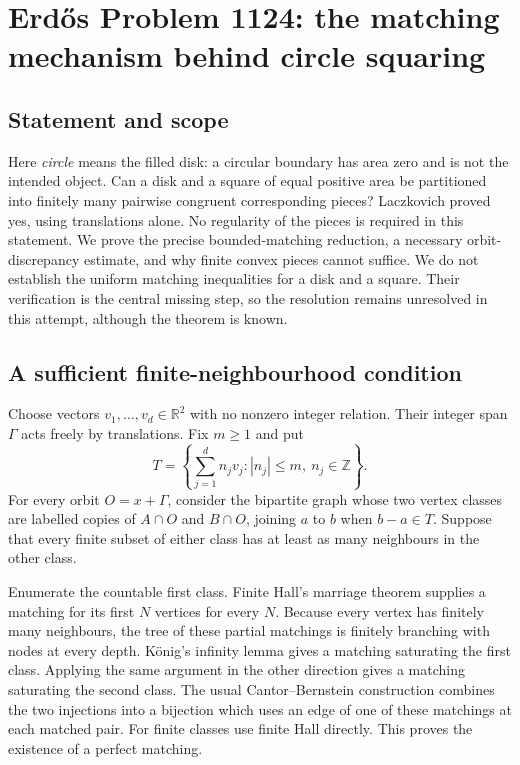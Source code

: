 \section*{Erd\H{o}s Problem 1124: the matching mechanism behind circle squaring}
\subsection*{Statement and scope}
Here \emph{circle} means the filled disk: a circular boundary has area zero and is not the intended object. Can a disk and a square of equal positive area be partitioned into finitely many pairwise congruent corresponding pieces? Laczkovich proved yes, using translations alone. No regularity of the pieces is required in this statement.
We prove the precise bounded-matching reduction, a necessary orbit-discrepancy estimate, and why finite convex pieces cannot suffice. We do not establish the uniform matching inequalities for a disk and a square. Their verification is the central missing step, so the resolution remains unresolved in this attempt, although the theorem is known.

\subsection*{A sufficient finite-neighbourhood condition}
Choose vectors $v_1,\ldots,v_d\in\mathbb R^2$ with no nonzero integer relation. Their integer span $\Gamma$ acts freely by translations. Fix $m\ge1$ and put
\[
 T=\left\{\sum_{j=1}^d n_jv_j:|n_j|\le m,\ n_j\in\mathbb Z\right\}.
\]
For every orbit $O=x+\Gamma$, consider the bipartite graph whose two vertex classes are labelled copies of $A\cap O$ and $B\cap O$, joining $a$ to $b$ when $b-a\in T$. Suppose that every finite subset of either class has at least as many neighbours in the other class.

Enumerate the countable first class. Finite Hall's marriage theorem supplies a matching for its first $N$ vertices for every $N$. Because every vertex has finitely many neighbours, the tree of these partial matchings is finitely branching with nodes at every depth. K\"onig's infinity lemma gives a matching saturating the first class. Applying the same argument in the other direction gives a matching saturating the second class. The usual Cantor--Bernstein construction combines the two injections into a bijection which uses an edge of one of these matchings at each matched pair. For finite classes use finite Hall directly. This proves the existence of a perfect matching.

